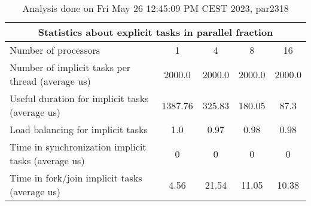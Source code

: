 \begin{table}[h]
\begin{center}
\begin{tabular}{|l|c|c|c|c|}
\hline
\multicolumn{5}{|c|}{Statistics about explicit tasks in parallel fraction} \\
\hline
\hline
Number of processors & 1 & 4 & 8 & 16 \\
\hline
\hline
Number of implicit tasks per thread (average us)    &          2000.0 &          2000.0 &          2000.0 &          2000.0 \\
\hline
Useful duration for implicit tasks (average us)     &         1387.76 &          325.83 &          180.05 &            87.3 \\
\hline
Load balancing for implicit tasks                &             1.0 &            0.97 &            0.98 &            0.98 \\
\hline
Time in synchronization implicit tasks (average us) &               0 &               0 &               0 &               0 \\
\hline
Time in fork/join implicit tasks (average us)       &            4.56 &           21.54 &           11.05 &           10.38 \\
\hline
\end{tabular}
\end{center}
\caption{ Analysis done on Fri May 26 12:45:09 PM CEST 2023, par2318}
\end{table}
